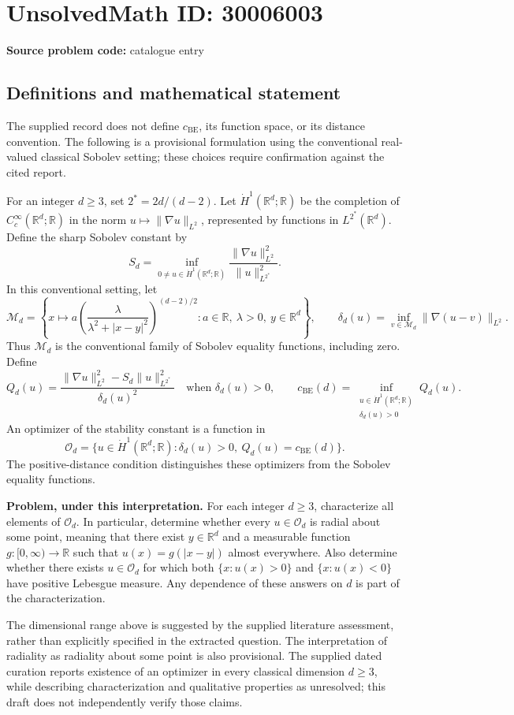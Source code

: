 \documentclass[11pt]{article}
\newcommand{\R}{\mathbb{R}}
\begin{document}
\section*{UnsolvedMath ID: 30006003}
\textbf{Source problem code:} catalogue entry
\subsection{Definitions and mathematical statement}
The supplied record does not define \(c_{\mathrm{BE}}\), its function space, or its distance convention. The following is a provisional formulation using the conventional real-valued classical Sobolev setting; these choices require confirmation against the cited report.

For an integer \(d\geq 3\), set \(2^*=2d/(d-2)\). Let \(\dot H^1(\R^d;\R)\) be the completion of \(C_c^\infty(\R^d;\R)\) in the norm \(u\mapsto\|\nabla u\|_{L^2}\), represented by functions in \(L^{2^*}(\R^d)\). Define the sharp Sobolev constant by
\[
S_d=\inf_{0\ne u\in\dot H^1(\R^d;\R)}
\frac{\|\nabla u\|_{L^2}^2}{\|u\|_{L^{2^*}}^2}.
\]
In this conventional setting, let
\[
\mathcal M_d=\left\{x\longmapsto a\left(\frac{\lambda}{\lambda^2+|x-y|^2}\right)^{(d-2)/2}:a\in\R,\ \lambda>0,\ y\in\R^d\right\},
\qquad
\delta_d(u)=\inf_{v\in\mathcal M_d}\|\nabla(u-v)\|_{L^2}.
\]
Thus \(\mathcal M_d\) is the conventional family of Sobolev equality functions, including zero. Define
\[
Q_d(u)=\frac{\|\nabla u\|_{L^2}^2-S_d\|u\|_{L^{2^*}}^2}{\delta_d(u)^2}
\quad\text{when }\delta_d(u)>0,
\qquad
c_{\mathrm{BE}}(d)=\inf_{\substack{u\in\dot H^1(\R^d;\R)\\\delta_d(u)>0}}Q_d(u).
\]
An optimizer of the stability constant is a function in
\[
\mathcal O_d=\{u\in\dot H^1(\R^d;\R):\delta_d(u)>0,\ Q_d(u)=c_{\mathrm{BE}}(d)\}.
\]
The positive-distance condition distinguishes these optimizers from the Sobolev equality functions.

\textbf{Problem, under this interpretation.} For each integer \(d\geq3\), characterize all elements of \(\mathcal O_d\). In particular, determine whether every \(u\in\mathcal O_d\) is radial about some point, meaning that there exist \(y\in\R^d\) and a measurable function \(g:[0,\infty)\to\R\) such that \(u(x)=g(|x-y|)\) almost everywhere. Also determine whether there exists \(u\in\mathcal O_d\) for which both \(\{x:u(x)>0\}\) and \(\{x:u(x)<0\}\) have positive Lebesgue measure. Any dependence of these answers on \(d\) is part of the characterization.

The dimensional range above is suggested by the supplied literature assessment, rather than explicitly specified in the extracted question. The interpretation of radiality as radiality about some point is also provisional. The supplied dated curation reports existence of an optimizer in every classical dimension \(d\geq3\), while describing characterization and qualitative properties as unresolved; this draft does not independently verify those claims.
\end{document}

